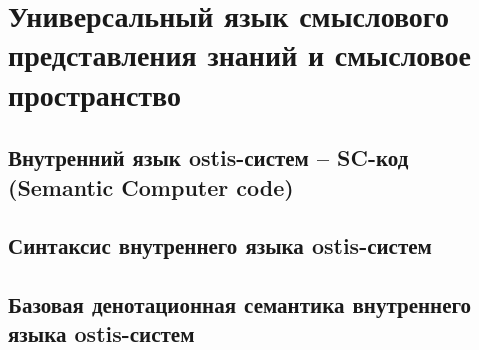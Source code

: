 \chapter{Универсальный язык смыслового представления знаний и смысловое пространство}
\label{chapter_sc_code}


\section{Внутренний язык ostis-систем -- SC-код (Semantic Computer code)}
\section{Синтаксис внутреннего языка ostis-систем}
\section{Базовая денотационная семантика внутреннего языка ostis-систем}

%